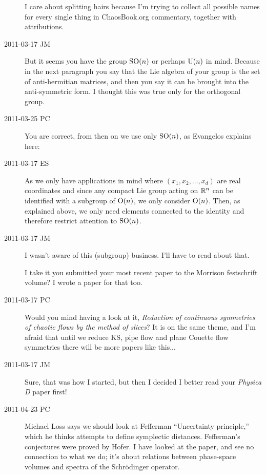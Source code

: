 \begin{description}
I care about splitting hairs because I'm trying to collect all possible
names for every single thing in ChaosBook.org commentary, together with
attributions.

\item[2011-03-17 JM]
But it seems you have the group $\textrm{SO}(n)$ or perhaps
$\textrm{U}(n)$ in mind. Because in the next paragraph
you say that the Lie algebra of your group is the set
of anti-hermitian matrices, and then you say it can be
brought into the anti-symmetric form. I thought this was
true only for the orthogonal group.

\item[2011-03-25 PC]
You are correct, from then on we use only  $\textrm{SO}(n)$, as Evangelos
explains here:

\item[2011-03-17 ES]
As we only have applications in mind where $(x_1,x_2,...,x_d)$ are real
coordinates and since any compact Lie group acting on $\mathbb{R}^n$ can be
identified with a subgroup of $\textrm{O}(n)$, we only consider $\textrm{O}(n)$. Then, as
explained above, we only need elements connected to the identity and
therefore restrict attention to $\textrm{SO}(n)$.

\item[2011-03-17 JM]
I wasn't aware of this (subgroup) business. I'll have to read about that.

I take it you submitted your most recent paper to the Morrison
festschrift volume? I wrote a paper for that too.

\item[2011-03-17 PC]
Would you mind having a look at it,
{\emph{Reduction of continuous}} \emph{symmetries of chaotic flows by the
method of slices}? It is on the same theme, and I'm afraid that until we
reduce KS, pipe flow and plane Couette flow symmetries there will be more
papers like this...

\item[2011-03-17 JM]
Sure, that was how I started, but then I decided I better read
your \emph{Physica D} paper first!

\item[2011-04-23 PC]
Michael Loss says we should look at Fefferman ``Uncertainty
principle,'' which he thinks attempts to define symplectic distances.
Fefferman's conjectures were proved by Hofer. I have looked at the paper,
and see no connection to what we do; it's about relations between
phase-space volumes and spectra of the Schr\"odinger operator.

\end{description}

